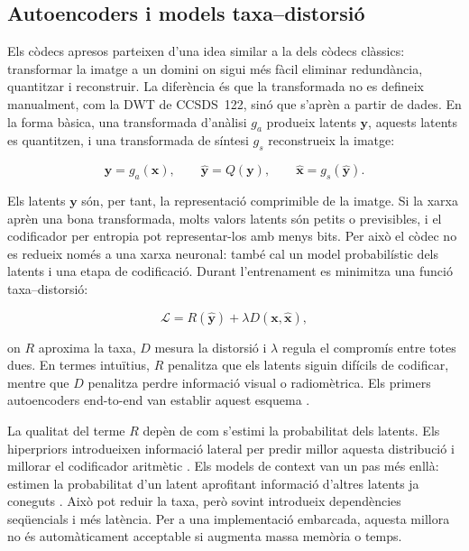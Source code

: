 \subsection{Autoencoders i models taxa--distorsió}

Els còdecs apresos parteixen d'una idea similar a la dels còdecs clàssics:
transformar la imatge a un domini on sigui més fàcil eliminar redundància,
quantitzar i reconstruir. La diferència és que la transformada no es defineix
manualment, com la DWT de CCSDS~122, sinó que s'aprèn a partir de dades. En la
forma bàsica, una transformada d'anàlisi $g_a$ produeix latents
$\mathbf{y}$, aquests latents es quantitzen, i una transformada de síntesi
$g_s$ reconstrueix la imatge:

\begin{equation}
\mathbf{y}=g_a(\mathbf{x}), \qquad
\hat{\mathbf{y}}=Q(\mathbf{y}), \qquad
\hat{\mathbf{x}}=g_s(\hat{\mathbf{y}}).
\end{equation}

Els latents $\mathbf{y}$ són, per tant, la representació comprimible de la
imatge. Si la xarxa aprèn una bona transformada, molts valors latents són petits
o previsibles, i el codificador per entropia pot representar-los amb menys
bits. Per això el còdec no es redueix només a una xarxa neuronal: també cal un
model probabilístic dels latents i una etapa de codificació. Durant
l'entrenament es minimitza una funció taxa--distorsió:

\begin{equation}
\mathcal{L}=R(\hat{\mathbf{y}})+\lambda D(\mathbf{x},\hat{\mathbf{x}}),
\label{eq:rd_loss}
\end{equation}

on $R$ aproxima la taxa, $D$ mesura la distorsió i $\lambda$ regula el
compromís entre totes dues. En termes intuïtius, $R$ penalitza que els latents
siguin difícils de codificar, mentre que $D$ penalitza perdre informació visual
o radiomètrica. Els primers autoencoders end-to-end van establir aquest esquema
\cite{balle2017end,theis2017lossy}.

La qualitat del terme $R$ depèn de com s'estimi la probabilitat dels latents.
Els hiperpriors introdueixen informació lateral per predir millor aquesta
distribució i millorar el codificador aritmètic
\cite{balle2018hyperprior,minnen2018joint}. Els models de context van un pas
més enllà: estimen la probabilitat d'un latent aprofitant informació d'altres
latents ja coneguts \cite{cheng2020learned,he2022elic}. Això pot reduir la taxa,
però sovint introdueix dependències seqüencials i més latència. Per a una
implementació embarcada, aquesta millora no és automàticament acceptable si
augmenta massa memòria o temps.

